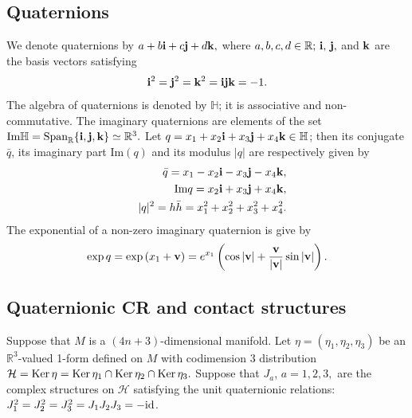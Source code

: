 \documentclass [12pt,a4paper]{amsart}
\renewcommand{\Im}{\textrm{Im}}
\newcommand{\calH}{\mathcal{H}}
\newcommand{\R}{\mathbb{R}}
\newcommand{\mH}{\mathbb{H}}
\newcommand{\bi}{{\bf i}}
\newcommand{\bj}{{\bf j}}
\newcommand{\bk}{{\bf k}}
\theoremstyle{plain}
\theoremstyle{definition}
\numberwithin{equation}{section}
\begin{document}
\subsection{Quaternions}
We denote quaternions by
$a+b\bi+c\bj+d\bk,$
where $a, b, c, d\in \R;\, \bi,\, \bj,$ and $\bk$ are the basis vectors satisfying
$$\bi^2=\bj^2=\bk^2=\bi\bj\bk=-1.$$ 
The algebra of quaternions is denoted by $\mH$; it is associative and non-commutative. The imaginary quaternions are elements of the set $\Im\mH=\rm{Span}_\R\{\bi, \bj, \bk\}\simeq\R^3.$ Let $q=x_1+x_2\bi+x_3\bj+x_4\bk\in\mH$; then its conjugate $\bar{q}$, its imaginary part $\Im(q)$ and its modulus $|q|$ are respectively given by
\begin{eqnarray*}
&&\bar{q}=x_1-x_2\bi-x_3\bj-x_4\bk,\\
&&\Im q=x_2\bi+x_3\bj+x_4\bk,\\
&&|q|^2=h\bar{h}=x_1^2+x_2^2+x_3^2+x_4^2.
\end{eqnarray*}
The exponential of a non-zero imaginary quaternion is give by
\[
{\rm exp}\, q={\rm exp}\, (x_1+{\bf v})=e^{x_1}\left(\cos|{\bf v}|+\frac{{\bf v}}{|{\bf v}|}\sin{|{\bf v}|}\right).
\]
\subsection{Quaternionic CR and  contact structures} Suppose that $M$ is a $(4n+3)$-dimensional manifold.  Let $\eta=(\eta_1, \eta_2, \eta_3)$ be an $\R^3$-valued 1-form defined on $M$ with codimension $3$ distribution $\calH={\rm Ker}\,\eta={\rm Ker}\, \eta_1\cap{\rm Ker}\, \eta_2\cap{\rm Ker}\, \eta_3.$ 
Suppose that $J_a$, $a=1, 2, 3,$ are the complex structures on $\calH$ satisfying the unit quaternionic relations: $J_1^2=J_2^2=J_3^2=J_1J_2J_3=-{\rm id}$.
\end{document}
